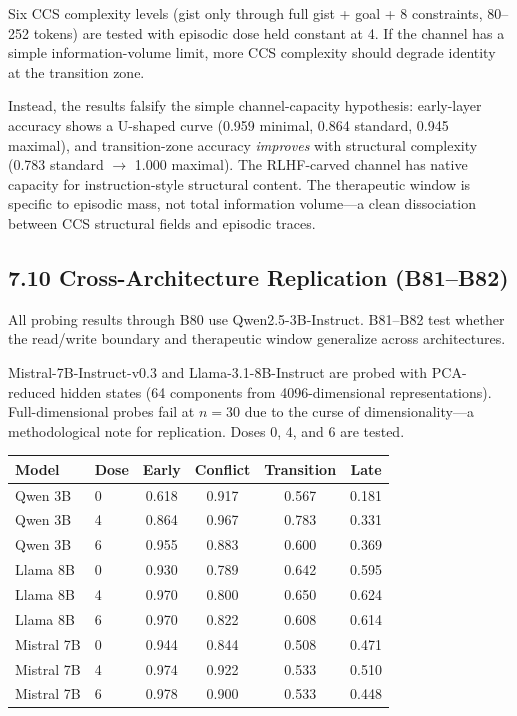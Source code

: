 \documentclass[11pt]{article}
\begin{document}
Six CCS complexity levels (gist only through full gist + goal + 8 constraints,
80--252 tokens) are tested with episodic dose held constant at 4. If the channel
has a simple information-volume limit, more CCS complexity should degrade identity
at the transition zone.

Instead, the results falsify the simple channel-capacity hypothesis:
early-layer accuracy shows a U-shaped curve (0.959 minimal, 0.864 standard,
0.945 maximal), and transition-zone accuracy \textit{improves} with structural
complexity (0.783 standard $\to$ 1.000 maximal). The RLHF-carved channel has
native capacity for instruction-style structural content. The therapeutic window
is specific to episodic mass, not total information volume---a clean dissociation
between CCS structural fields and episodic traces.

\subsection{7.10 Cross-Architecture Replication (B81--B82)}

All probing results through B80 use Qwen2.5-3B-Instruct. B81--B82 test whether
the read/write boundary and therapeutic window generalize across architectures.

Mistral-7B-Instruct-v0.3 and Llama-3.1-8B-Instruct are probed with PCA-reduced
hidden states (64 components from 4096-dimensional representations). Full-dimensional
probes fail at $n=30$ due to the curse of dimensionality---a methodological note
for replication. Doses 0, 4, and 6 are tested.

\begin{center}
\begin{tabular}{llcccc}
\toprule
Model & Dose & Early & Conflict & Transition & Late \\
\midrule
Qwen 3B  & 0 & 0.618 & 0.917 & 0.567 & 0.181 \\
Qwen 3B  & 4 & 0.864 & 0.967 & 0.783 & 0.331 \\
Qwen 3B  & 6 & 0.955 & 0.883 & 0.600 & 0.369 \\
\midrule
Llama 8B & 0 & 0.930 & 0.789 & 0.642 & 0.595 \\
Llama 8B & 4 & 0.970 & 0.800 & 0.650 & 0.624 \\
Llama 8B & 6 & 0.970 & 0.822 & 0.608 & 0.614 \\
\midrule
Mistral 7B & 0 & 0.944 & 0.844 & 0.508 & 0.471 \\
Mistral 7B & 4 & 0.974 & 0.922 & 0.533 & 0.510 \\
Mistral 7B & 6 & 0.978 & 0.900 & 0.533 & 0.448 \\
\bottomrule
\end{tabular}
\end{center}
\end{document}
